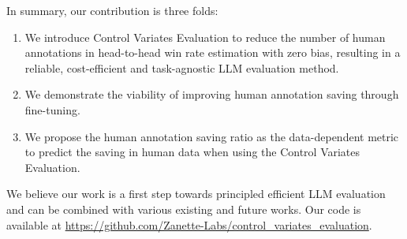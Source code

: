 In summary, our contribution is three folds:
\begin{enumerate}[ topsep=0pt,itemsep=-1ex,partopsep=1ex,parsep=1ex]
    \item We introduce Control Variates Evaluation to reduce the number of human annotations in head-to-head win rate estimation with zero bias, resulting in a reliable, cost-efficient and task-agnostic LLM evaluation method.
    \item We demonstrate the viability of improving human annotation saving through fine-tuning.
    \item We propose the human annotation saving ratio as the data-dependent metric to predict the saving in human data when using the Control Variates Evaluation.
\end{enumerate}
We believe our work is a first step towards principled efficient LLM evaluation and can be combined with various existing and future works.  
Our code is available at \url{https://github.com/Zanette-Labs/control_variates_evaluation}.